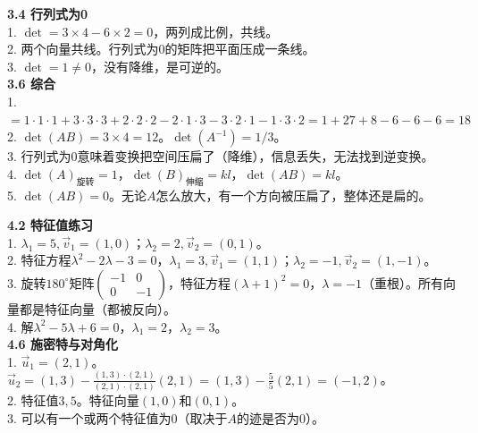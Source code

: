 \documentclass[a4paper,12pt]{ctexart}
\begin{document}
\noindent\textbf{3.4 行列式为0}\\
1. $\det=3\times4-6\times2=0$，两列成比例，共线。\\
2. 两个向量共线。行列式为$0$的矩阵把平面压成一条线。\\
3. $\det=1\neq0$，没有降维，是可逆的。\\

\noindent\textbf{3.6 综合}\\
1. $=1\cdot1\cdot1+3\cdot3\cdot3+2\cdot2\cdot2-2\cdot1\cdot3-3\cdot2\cdot1-1\cdot3\cdot2=1+27+8-6-6-6=18$\\
2. $\det(AB)=3\times4=12$。$\det(A^{-1})=1/3$。\\
3. 行列式为$0$意味着变换把空间压扁了（降维），信息丢失，无法找到逆变换。\\
4. $\det(A)_{\text{旋转}}=1$，$\det(B)_{\text{伸缩}}=kl$，$\det(AB)=kl$。\\
5. $\det(AB)=0$。无论$A$怎么放大，有一个方向被压扁了，整体还是扁的。\\


\noindent\textbf{4.2 特征值练习}\\
1. $\lambda_1=5,\vec v_1=(1,0)$；$\lambda_2=2,\vec v_2=(0,1)$。\\
2. 特征方程$\lambda^2-2\lambda-3=0$，$\lambda_1=3,\vec v_1=(1,1)$；$\lambda_2=-1,\vec v_2=(1,-1)$。\\
3. 旋转$180^\circ$矩阵$\begin{pmatrix}-1&0\\0&-1\end{pmatrix}$，特征方程$(\lambda+1)^2=0$，$\lambda=-1$（重根）。所有向量都是特征向量（都被反向）。\\
4. 解$\lambda^2-5\lambda+6=0$，$\lambda_1=2$，$\lambda_2=3$。\\

\noindent\textbf{4.6 施密特与对角化}\\
1. $\vec u_1=(2,1)$。$\vec u_2=(1,3)-\frac{(1,3)\cdot(2,1)}{(2,1)\cdot(2,1)}(2,1)=(1,3)-\frac{5}{5}(2,1)=(-1,2)$。\\
2. 特征值$3,5$。特征向量$(1,0)$和$(0,1)$。\\
3. 可以有一个或两个特征值为$0$（取决于$A$的迹是否为$0$）。\\

\end{document}
